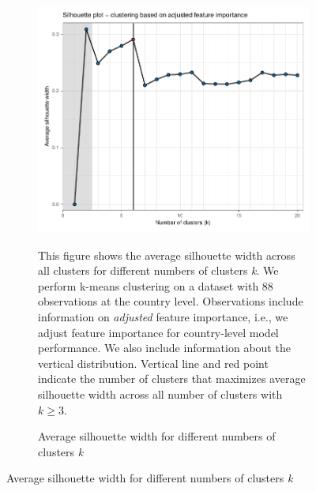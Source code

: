 \begin{figure}[ht!]
\centering
  \caption{Silhouette analysis}\label{fig:Silhouette}
   \begin{subfigure}[b]{\textwidth}
   \centering
   \includegraphics{Figures_Appendix/Figure_Silhouette_2.pdf}
   \caption{Average silhouette width for different numbers of clusters \textit{k}} \label{fig:G3_silhouette_2}
   \begin{subcaption2}
     This figure shows the average silhouette width across all clusters for different numbers of clusters \textit{k}. We perform k-means clustering on a dataset with 88 observations at the country level. Observations include information on \textit{adjusted} feature importance, i.e., we adjust feature importance for country-level model performance. We also include information about the vertical distribution. Vertical line and red point indicate the number of clusters that maximizes average silhouette width across all number of clusters with $k \geq 3$.
   \end{subcaption2}
   \end{subfigure}
 \end{figure}
 \clearpage

